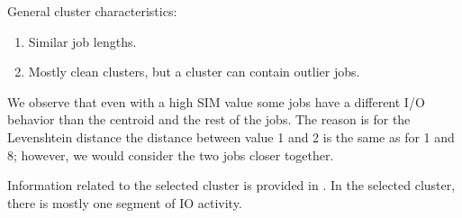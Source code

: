 \documentclass{jhps}
\begin{document}
General cluster characteristics:
\begin{enumerate}
 \item Similar job lengths.
 \item Mostly clean clusters, but a cluster can contain outlier jobs.
\end{enumerate}

We observe that even with a high SIM value some jobs have a different I/O behavior than the centroid and the rest of the jobs.
The reason is for the Levenshtein distance the distance between value 1 and 2 is the same as for 1 and 8; however, we would consider the two jobs closer together.

Information related to the selected cluster is provided in .
In the selected cluster, there is mostly one segment of IO activity.
\end{document}
